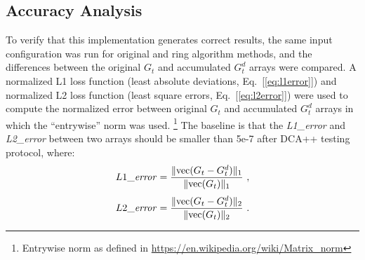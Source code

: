 \subsection{Accuracy Analysis}
To verify that this implementation generates correct results, 
the same input configuration was run  for original and ring algorithm methods, and the differences between the original $G_t$ and accumulated $G^d_t$ arrays were compared. 
%
A normalized L1 loss function (least absolute deviations, Eq.~[\ref{eq:l1error}]) and normalized L2 loss 
function (least square errors, Eq.~[\ref{eq:l2error}]) were used to compute the normalized error between original $G_t$ 
and accumulated $G^d_t$ arrays in which the ``entrywise''  norm was used.%
\footnote{Entrywise norm as defined in \url{https://en.wikipedia.org/wiki/Matrix_norm}}
%
The baseline is that the \textit{L1\_error} and \textit{L2\_error} between two arrays 
should be smaller than 5e-7 after DCA++ testing protocol, where:
%
\begin{equation}
\label{eq:l1error}
    L1\_{\mbox{\textit{error}}} = \frac{\| \mbox{vec}(G_t - G^d_t) \|_{1} }{\| \mbox{vec}(G_t) \|_{1}}
 ~ ,                                      
\end{equation}
\hfill
\begin{equation}
\label{eq:l2error}
    L2\_{\mbox{\textit{error}}} = \frac{ \| \mbox{vec}(G_t - G^d_t) \|_{2} }{ \| \mbox{vec}(G_t) \|_{2} }
~ .
\end{equation}

